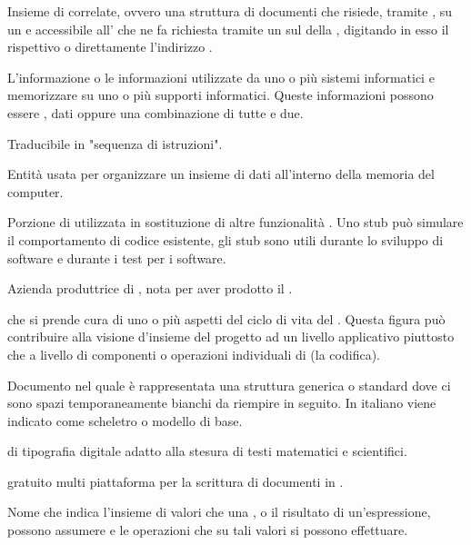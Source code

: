 {Insieme di  correlate, ovvero una struttura  di documenti che risiede, tramite , su un   e accessibile all'  che ne fa richiesta tramite un  sul  della  , digitando in esso il rispettivo  o direttamente l'indirizzo .}

{L'informazione o le informazioni utilizzate da uno o più sistemi informatici e memorizzare su uno o più supporti informatici. Queste informazioni possono essere , dati oppure una combinazione di tutte e due.}

{Traducibile in "sequenza di istruzioni".}

{Entità usata per organizzare un insieme di dati all'interno della memoria del computer.}

{Porzione di  utilizzata in sostituzione di altre funzionalità . Uno stub può simulare il comportamento di codice esistente, gli stub sono utili durante lo sviluppo di software e durante i test per i software.}

{Azienda produttrice di , nota per aver prodotto il  .}

{ che si prende cura di uno o più aspetti del ciclo di vita del . Questa figura può contribuire alla visione d'insieme del progetto ad un livello applicativo piuttosto che a livello di componenti o operazioni individuali di  (la codifica).}




{Documento nel quale è rappresentata una struttura generica o standard dove ci sono spazi temporaneamente bianchi da riempire in seguito. In italiano viene indicato come scheletro o modello di base.}

{ di tipografia digitale adatto alla stesura di testi matematici e scientifici.}

{ gratuito multi piattaforma per la scrittura di documenti in .}

{Nome che indica l'insieme di valori che una , o il risultato di un'espressione, possono assumere e le operazioni che su tali valori si possono effettuare.}


